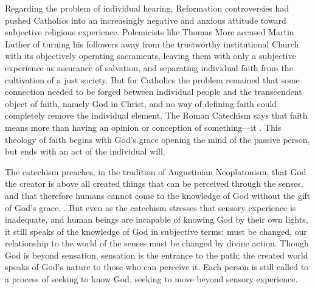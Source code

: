 Regarding the problem of individual hearing, Reformation controversies had pushed Catholics into an increasingly negative and anxious attitude toward subjective religious experience.
Polemicists like Thomas More accused Martin Luther of turning his followers away from the trustworthy institutional Church with its objectively operating sacraments, leaving them with only a subjective experience as assurance of salvation, and separating individual faith from the cultivation of a just society.%
    \Autocite[ch.~4]{Schreiner:Certainty}
But for Catholics the problem remained that some connection needed to be forged between individual people and the transcendent object of faith, namely God in Christ, and no way of defining faith could completely remove the individual element.
The Roman Catechism says that faith means more than having an opinion or conception of something---it .%
    \Autocite
    [15: .]
    {Catholic:Catechismus1614}
This theology of faith begins with God's grace opening the mind of the passive person, but ends with an act of the individual will.

The catechism preaches, in the tradition of Augustinian Neoplatonism, that God the creator is above all created things that can be perceived through the senses, and that therefore humans cannot come to the knowledge of God without the gift of God's grace.
.%
    \Autocite
    [18: .]
    {Catholic:Catechismus1614}
But even as the catechism stresses that sensory experience is inadequate, and human beings are incapable of knowing God by their own lights, it still speaks of the knowledge of God in subjective terms:  must be changed, our relationship to the world of the senses must be changed by divine action.
Though God is beyond sensation, sensation is the entrance to the path; the created world speaks of God's nature to those who can perceive it.
Each person is still called to a process of seeking to know God, seeking to move beyond sensory experience.

